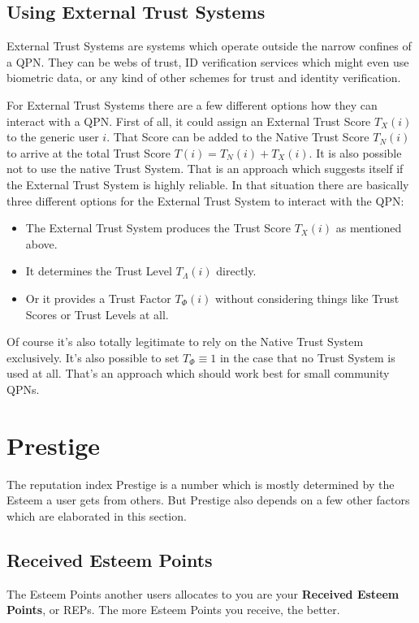 \documentclass[a4paper,12pt]{scrartcl}
\begin{document}
\subsection{Using External Trust Systems}
External Trust Systems are systems which operate outside the narrow confines of a QPN. They can be webs of trust, ID verification services which might even use biometric data, or any kind of other schemes for trust and identity verification.

For External Trust Systems there are a few different options how they can interact with a QPN. First of all, it could assign an External Trust Score $T_X(i)$ to the generic user $i$. That Score can be added to the Native Trust Score $T_N(i)$ to arrive at the total Trust Score $T(i) = T_N(i) + T_X(i)$. It is also possible not to use the native Trust System. That is an approach which suggests itself if the External Trust System is highly reliable. In that situation there are basically three different options for the External Trust System to interact with the QPN:
\begin{itemize}
 \item The External Trust System produces the Trust Score $T_X(i)$ as mentioned above.
 \item It determines the Trust Level $T_{\Lambda}(i)$ directly.
 \item Or it provides a Trust Factor $T_{\Phi}(i)$ without considering things like Trust Scores or Trust Levels at all.
\end{itemize}

Of course it's also totally legitimate to rely on the Native Trust System exclusively. It's also possible to set $T_{\Phi} \equiv 1$ in the case that no Trust System is used at all. That's an approach which should work best for small community QPNs.


\section{Prestige}
The reputation index Prestige is a number which is mostly determined by the Esteem a user gets from others. But Prestige also depends on a few other factors which are elaborated in this section.

\subsection{Received Esteem Points}
The Esteem Points another users allocates to you are your \textbf{Received Esteem Points}, or REPs. The more Esteem Points you receive, the better.
\end{document}
